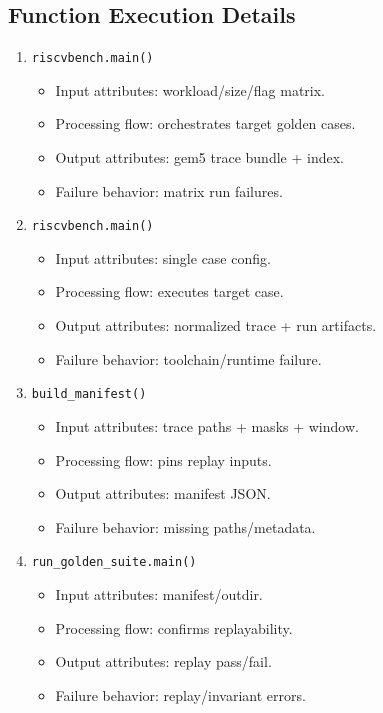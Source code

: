 \documentclass[11pt,a4paper]{article}
\begin{document}
\subsection*{Function Execution Details}
\begin{enumerate}[leftmargin=*]
  \item \texttt{riscvbench.main()}
  \begin{itemize}[leftmargin=*]
    \item Input attributes: workload/size/flag matrix.
    \item Processing flow: orchestrates target golden cases.
    \item Output attributes: gem5 trace bundle + index.
    \item Failure behavior: matrix run failures.
  \end{itemize}
  \item \texttt{riscvbench.main()}
  \begin{itemize}[leftmargin=*]
    \item Input attributes: single case config.
    \item Processing flow: executes target case.
    \item Output attributes: normalized trace + run artifacts.
    \item Failure behavior: toolchain/runtime failure.
  \end{itemize}
  \item \texttt{build\_manifest()}
  \begin{itemize}[leftmargin=*]
    \item Input attributes: trace paths + masks + window.
    \item Processing flow: pins replay inputs.
    \item Output attributes: manifest JSON.
    \item Failure behavior: missing paths/metadata.
  \end{itemize}
  \item \texttt{run\_golden\_suite.main()}
  \begin{itemize}[leftmargin=*]
    \item Input attributes: manifest/outdir.
    \item Processing flow: confirms replayability.
    \item Output attributes: replay pass/fail.
    \item Failure behavior: replay/invariant errors.
  \end{itemize}
\end{enumerate}
\end{document}
